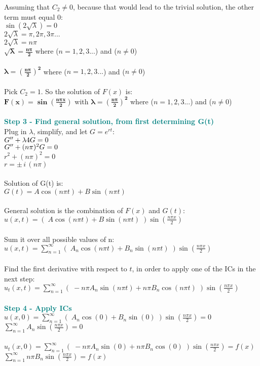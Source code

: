 \documentclass{article}
\begin{document}
\begin{enumerate}
Assuming that $C_2 \neq 0$, because that would lead to the trivial solution, the other term must equal 0:\\
$\sin(2\sqrt{\lambda}) = 0$\\
$2\sqrt{\lambda} = \pi, 2\pi, 3\pi...$\\
$2\sqrt{\lambda} = n\pi$\\
$\bm{\sqrt{\lambda} = \frac{n\pi}{2}}$ where ($n=1,2,3...$) and ($n\neq0$)\\\\
$\bm{\lambda = (\frac{n\pi}{2})^2}$ where ($n=1,2,3...$) and ($n\neq0$)\\\\
Pick $C_2 = 1$. So the solution of $F(x)$ is:\\
$\bm{F(x)= \sin(\frac{n\pi x}{2})}$ with $\bm{\lambda = (\frac{n\pi}{2})^2}$ where ($n=1,2,3...$) and ($n\neq0$)\\\\
\textcolor{teal}{\textbf{Step 3 - Find general solution, from first determining G(t)}}\\
Plug in $\lambda$, simplify, and let $G=e^{rt}$:\\
$G\sp{\prime\prime} + \lambda 4G = 0$\\
$G\sp{\prime\prime} + (n\pi)^2G = 0$\\
$r^2 + (n\pi)^2 = 0$\\
$r = \pm\,i \,(n\pi)$\\\\
Solution of G(t) is:\\
$G(t) = A\cos(n\pi t) + B\sin(n\pi t)$\\\\
General solution is the combination of $F(x)$ and $G(t)$:\\
$u(x,t) = \left(\;A\cos(n\pi t) + B\sin(n\pi t)\;\right)\sin\left(\frac{n\pi x}{2}\right)$\\\\
Sum it over all possible values of n:\\
$u(x,t) = \sum_{n=1}^{\infty} \left(\;A_n\cos(n\pi t) + B_n\sin(n\pi t)\;\right)\sin\left(\frac{n\pi x}{2}\right)$\\\\
Find the first derivative with respect to $t$, in order to apply one of the ICs in the next step:\\
$u_t(x,t) = \sum_{n=1}^{\infty} \left(\;-n\pi A_n\sin(n\pi t) + n\pi B_n\cos(n\pi t)\;\right)\sin\left(\frac{n\pi x}{2}\right)$\\\\
\textcolor{teal}{\textbf{Step 4 - Apply ICs}}\\
$u(x,0) = \sum_{n=1}^{\infty} \left(\;A_n\cos(0) + B_n\sin(0)\;\right)\sin\left(\frac{n\pi x}{2}\right) = 0$\\
$\sum_{n=1}^{\infty} A_n\sin\left(\frac{n\pi x}{2}\right) = 0$\\\\
$u_t(x,0) = \sum_{n=1}^{\infty} \left(\;-n\pi A_n\sin(0) + n\pi B_n\cos(0)\;\right)\sin\left(\frac{n\pi x}{2}\right) = f(x)$\\
$\sum_{n=1}^{\infty} n\pi B_n\sin\left(\frac{n\pi x}{2}\right) = f(x)$\\


\end{enumerate}
\end{document}
